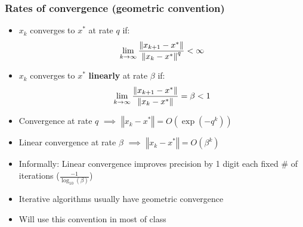 \documentclass[bigger]{beamer}
\begin{document}
\begin{frame}%

\frametitle{Rates of convergence (geometric convention)}

\begin{itemize}
\item $x_{k}$ converges to $x^{\ast }$ at rate $q$ if:%
\begin{equation*}
\lim_{k\rightarrow \infty }\frac{\left\Vert x_{k+1}-x^{\ast }\right\Vert }{%
\left\Vert x_{k}-x^{\ast }\right\Vert ^{q}}<\infty
\end{equation*}

\item $x_{k}$ converges to $x^{\ast }$ \textbf{linearly} at rate $\beta $ if:%
\begin{equation*}
\lim_{k\rightarrow \infty }\frac{\left\Vert x_{k+1}-x^{\ast }\right\Vert }{%
\left\Vert x_{k}-x^{\ast }\right\Vert }=\beta <1
\end{equation*}

\item Convergence at rate $q$ $\implies$ $\left\Vert x_{k}-x^{\ast}\right\Vert=O(\exp(-q^{k}))$

\item Linear convergence at rate $\beta$ $\implies$ $\left\Vert x_{k}-x^{\ast}\right\Vert=O(\beta^{k})$

\item Informally: Linear convergence improves precision by 1 digit each fixed $\#$ of iterations ($\frac{-1}{\log_{10}(\beta)}$)

\item Iterative algorithms usually have geometric convergence

\item Will use this convention in most of class

\end{itemize}


\end{frame}%
\end{document}
